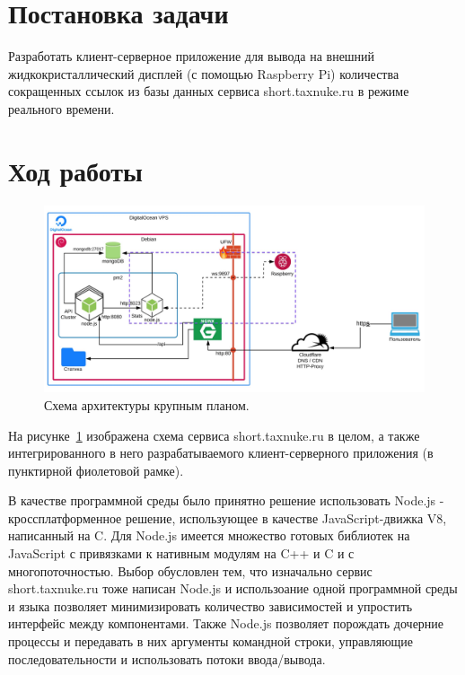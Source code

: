 \documentclass[a4paper, 12pt]{article}
\begin{document}
    

    \newpage

    \section*{Постановка задачи}
    Разработать клиент-серверное приложение для вывода на внешний жидкокристаллический
    дисплей (с помощью Raspberry Pi) количества сокращенных ссылок из базы данных сервиса short.taxnuke.ru в режиме реального времени.

    \section*{Ход работы}
    \begin{figure}
        \includegraphics[width=\linewidth]{img/arch.jpg}
        \caption{Схема архитектуры крупным планом.}
        \label{fig:big_arch}
    \end{figure}

    На рисунке~\ref{fig:big_arch} изображена схема сервиса short.taxnuke.ru в целом, а также интегрированного в него
    разрабатываемого клиент-серверного приложения (в пунктирной фиолетовой рамке).

    В качестве программной среды было принятно решение использовать Node.js - кроссплатформенное решение,
    использующее в качестве JavaScript-движка V8, написанный на C. Для Node.js имеется множество готовых библиотек
    на JavaScript с привязками к нативным модулям на C++ и C и с многопоточностью.
    Выбор обусловлен тем, что изначально сервис short.taxnuke.ru тоже написан Node.js и использоание
    одной программной среды и языка позволяет минимизировать количество зависимостей и упростить интерфейс между компонентами.
    Также Node.js позволяет порождать дочерние процессы и передавать в них аргументы командной
    строки, управляющие последовательности и использовать потоки ввода/вывода.
\end{document}
